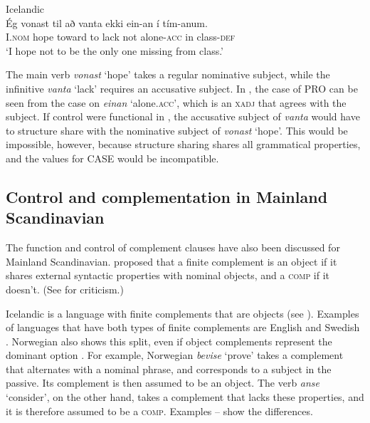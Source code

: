 \documentclass[output=paper,hidelinks]{langscibook}
\begin{document}
\ea\label{ex:Scandinavian:41} Icelandic \citep[474]{Andrews82}\\
\gll
 {Ég} {vonast} {til} {að} {vanta} {ekki} {ein-an} {í} {tím-anum.}\\
 I.\textsc{nom} hope toward to lack not alone-\textsc{acc} in class-\textsc{def}\\
\glt `I hope not to be the only one missing from class.'\z

\noindent The main verb \textit{vonast} `hope' takes a regular nominative subject, while the infinitive \textit{vanta} `lack' requires an accusative subject. In , the case of PRO can be seen from the case on \textit{einan} `alone.\textsc{acc}{}', which is an \textsc{xadj} that agrees with the subject. If control were functional in , the accusative subject of \textit{vanta} would have to structure share with the nominative subject of \textit{vonast} `hope'. This would be impossible, however, because structure sharing shares all grammatical properties, and the values for CASE would be incompatible.

\subsection{Control and complementation in Mainland Scandinavian}

The function and control of complement clauses have also been discussed for Mainland Scandinavian. \citet{DL00} proposed that a finite complement is an object if it shares external syntactic properties with nominal objects, and a \textsc{comp} if it doesn't. (See \citealt{AMM05} for criticism.)

\hspace*{-3pt} Icelandic is a language with finite complements that are objects (see ). Examples of languages that have both types of finite complements are English and Swedish \citep{DL00}. Norwegian also shows this split, even if object complements represent the dominant option \citep{Lodrup04}. For example, Norwegian \textit{bevise} `prove' takes a complement that alternates with a nominal phrase, and corresponds to a subject in the passive. Its complement is then assumed to be an object. The verb \textit{anse} `consider', on the other hand, takes a complement that lacks these properties, and it is therefore assumed to be a \textsc{comp}. Examples -- show the differences.
\end{document}
